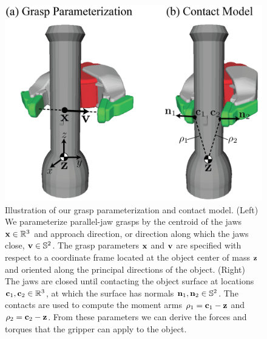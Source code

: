 \begin{figure}[t!]
\centering
\includegraphics[scale=0.4]{figures/illustrations/dexnet_grasping_model.png}
\caption{Illustration of our grasp parameterization and contact model. (Left) We parameterize parallel-jaw grasps by the centroid of the jaws $\mathbf{x} \in \mathbb{R}^3$ and approach direction, or direction along which the jaws close, $\mathbf{v} \in \mathbb{S}^2$. The grasp parameters $\mathbf{x}$ and $\mathbf{v}$ are specified with respect to a coordinate frame located at the object center of mass $\mathbf{z}$ and oriented along the principal directions of the object. (Right) The jaws are closed until contacting the object surface at locations $\mathbf{c}_1, \mathbf{c}_2 \in \mathbb{R}^3$, at which the surface has normals $\mathbf{n}_1, \mathbf{n}_2 \in \mathbb{S}^2$. The contacts are used to compute the moment arms $\rho_1 = \mathbf{c}_1 - \mathbf{z}$ and $\rho_2  = \mathbf{c}_2 - \mathbf{z}$. From these parameters we can derive the forces and torques that the gripper can apply to the object. }
\vspace*{-15pt}
\end{figure}



